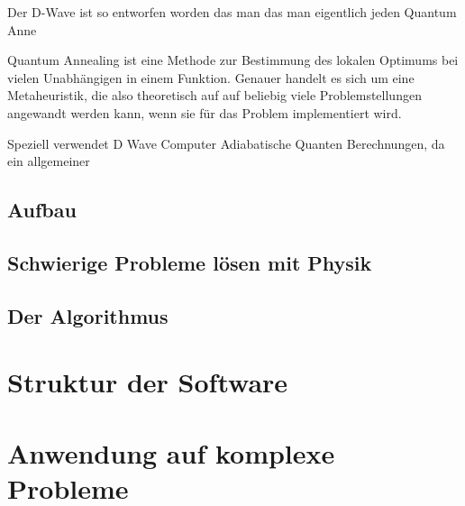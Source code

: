 \documentclass{article}
\begin{document}
Der D-Wave ist so entworfen worden das man das man eigentlich jeden Quantum Anne


Quantum Annealing ist eine Methode zur Bestimmung des lokalen Optimums bei vielen Unabhängigen in einem Funktion. Genauer handelt es sich um eine Metaheuristik, die also theoretisch auf auf beliebig viele Problemstellungen angewandt werden kann, wenn sie für das Problem implementiert wird.

Speziell verwendet D Wave Computer Adiabatische Quanten Berechnungen,
da ein allgemeiner 
 




\subsection{Aufbau}\label{sec:funktion}\cite{ref:one}

\subsection{Schwierige Probleme lösen mit Physik}\label{sec:historyAlgo}
\subsection{Der Algorithmus}\label{sec:algo}
\section{Struktur der Software}\label{sec:software}
\section{Anwendung auf komplexe Probleme}\label{sec:problems}

\cleardoublepage


\end{document}
